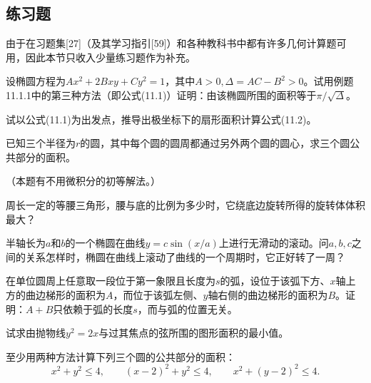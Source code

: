 \subsection{练习题}

由于在习题集[27]（及其学习指引[59]）和各种教科书中都有许多几何计算题可用，因此本节只收入少量练习题作为补充。

\begin{xexercise}[1]
设椭圆方程为$Ax^2+2Bxy+Cy^2=1$，其中$A>0,\Delta=AC-B^2>0$。试用例题11.1.1中的第三种方法（即公式(11.1)）证明：由该椭圆所围的面积等于$\pi/\sqrt\Delta$。
\end{xexercise}

\begin{xexercise}[2]
试以公式(11.1)为出发点，推导出极坐标下的扇形面积计算公式(11.2)。
\end{xexercise}

\begin{xexercise}[3]
已知三个半径为$r$的圆，其中每个圆的圆周都通过另外两个圆的圆心，求三个圆公共部分的面积。

  （本题有不用微积分的初等解法。）
\end{xexercise}

\begin{xexercise}[4]
周长一定的等腰三角形，腰与底的比例为多少时，它绕底边旋转所得的旋转体体积最大？
\end{xexercise}

\begin{xexercise}[5]
半轴长为$a$和$b$的一个椭圆在曲线$y=c\sin(x/a)$上进行无滑动的滚动。问$a,b,c$之间的关系怎样时，椭圆在曲线上滚动了曲线的一个周期时，它正好转了一周？
\end{xexercise}

\begin{xexercise}[6]
在单位圆周上任意取一段位于第一象限且长度为$s$的弧，设位于该弧下方、$x$轴上方的曲边梯形的面积为$A$，而位于该弧左侧、$y$轴右侧的曲边梯形的面积为$B$。证明：$A+B$只依赖于弧的长度$s$，而与弧的位置无关。
\end{xexercise}

\begin{xexercise}[7]
试求由抛物线$y^2=2x$与过其焦点的弦所围的图形面积的最小值。
\end{xexercise}

\begin{xexercise}[8]
至少用两种方法计算下列三个圆的公共部分的面积：
  \[
    x^2+y^2\le4,\qquad (x-2)^2+y^2\le4,\qquad x^2+(y-2)^2\le4.
  \]
\end{xexercise}

